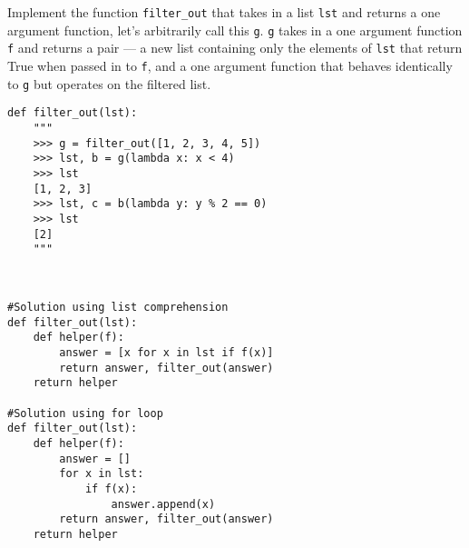 \begin{blocksection}
\question Implement the function \lstinline$filter_out$ that takes in a list \lstinline$lst$ and returns a one argument function, let’s arbitrarily call this \lstinline$g$. \lstinline$g$ takes in a one argument function \lstinline$f$  and returns a pair — a new list containing only the elements of \lstinline$lst$ that return True when passed in to \lstinline$f$, and a one argument function that behaves identically to \lstinline$g$ but operates on the filtered list.

\begin{lstlisting}
def filter_out(lst):
    """
    >>> g = filter_out([1, 2, 3, 4, 5])
    >>> lst, b = g(lambda x: x < 4)
    >>> lst
    [1, 2, 3]
    >>> lst, c = b(lambda y: y % 2 == 0)
    >>> lst
    [2]
    """

    
\end{lstlisting}

\begin{solution}[1.5in]
\begin{lstlisting}
#Solution using list comprehension
def filter_out(lst):
    def helper(f):
        answer = [x for x in lst if f(x)]
        return answer, filter_out(answer)
    return helper
    
#Solution using for loop
def filter_out(lst):
    def helper(f):
        answer = []
        for x in lst:
            if f(x):
                answer.append(x)
        return answer, filter_out(answer)
    return helper
\end{lstlisting}
\end{solution}
\end{blocksection}
